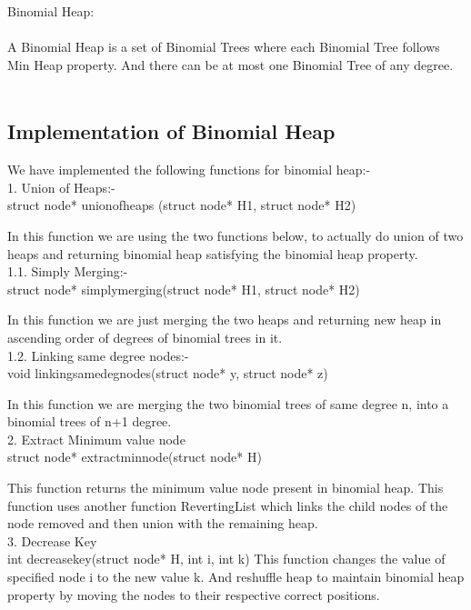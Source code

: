\documentclass[10pt,a4paper]{article} ,
\begin{document}
Binomial Heap:\\ \\
A Binomial Heap is a set of Binomial Trees where each Binomial Tree follows Min Heap property. And there can be at most one Binomial Tree of any degree. \\ \\


\subsection*{Implementation of Binomial Heap}

We have implemented the following functions for binomial heap:- \\ 
	

1. Union of Heaps:-\\
	struct node* unionofheaps (struct node* H1, struct node* H2) 
	
	In this function we are using the two functions below, to actually do union of two heaps  and returning binomial heap satisfying the binomial heap property.\\

1.1. Simply Merging:- 
	\\struct node* simplymerging(struct node* H1, struct node* H2) 
	
	In this function we are just merging the two heaps and returning new heap in ascending order of degrees of binomial trees in it.\\
	
	
1.2. Linking same degree nodes:-
	\\void linkingsamedegnodes(struct node* y, struct node* z) 
	
	In this function we are merging the two binomial trees of same degree n, into a binomial trees of n+1 degree.\\
	
2. Extract Minimum value node
	\\struct node* extractminnode(struct node* H)
	
	This function returns the minimum value node present in binomial heap.
	This function uses another function RevertingList which links the child nodes of the node removed and then union with the remaining heap. \\
	
3. Decrease Key
	\\int decreasekey(struct node* H, int i, int k) 
	This function changes the value of specified node i to the new value k. And reshuffle heap to maintain binomial heap property by moving the nodes to their respective correct positions.\\
\end{document}
